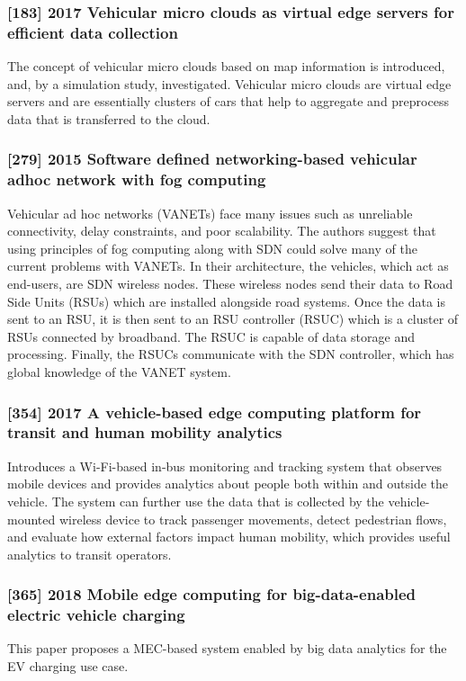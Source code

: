 \subsubsection{[183] 2017 Vehicular micro clouds as virtual edge servers for efficient data collection}
The concept of vehicular micro clouds based on map information is introduced, and, by a simulation study, investigated. Vehicular micro clouds are virtual edge servers and are essentially clusters of cars that help to aggregate and preprocess data that is transferred to the cloud.

\subsubsection{[279] 2015 Software defined networking-based vehicular adhoc network with fog computing}
Vehicular ad hoc networks (VANETs) face many issues such as unreliable connectivity, delay constraints, and poor scalability. The authors suggest that using principles of fog computing along with SDN could solve many of the current problems with VANETs. In their architecture, the vehicles, which act as end-users, are SDN wireless nodes. These wireless nodes send their data to Road Side Units (RSUs) which are installed alongside road systems. Once the data is sent to an RSU, it is then sent to an RSU controller (RSUC) which is a cluster of RSUs connected by broadband. The RSUC is capable of data storage and processing. Finally, the RSUCs communicate with the SDN controller, which has global knowledge of the VANET system.

\subsubsection{[354] 2017 A vehicle-based edge computing platform for transit and human mobility analytics}
Introduces a Wi-Fi-based in-bus monitoring and tracking system that observes mobile devices and provides analytics about people both within and outside the vehicle. The system can further use the data that is collected by the vehicle-mounted wireless device to track passenger movements, detect pedestrian flows, and evaluate how external factors impact human mobility, which provides useful analytics to transit operators.

\subsubsection{[365] 2018 Mobile edge computing for big-data-enabled electric vehicle charging}
This paper proposes a MEC-based system enabled by big data analytics for the EV charging use case.

